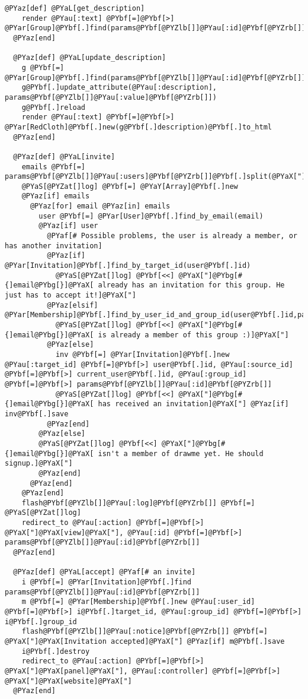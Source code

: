 \begin{Verbatim}[commandchars=@\[\]]
  @PYaz[def] @PYaL[get_description]
    render @PYau[:text] @PYbf[=]@PYbf[>] @PYar[Group]@PYbf[.]find(params@PYbf[@PYZlb[]]@PYau[:id]@PYbf[@PYZrb[]])@PYbf[.]description(@PYau[:source])
  @PYaz[end]
  
  @PYaz[def] @PYaL[update_description]
    g @PYbf[=] @PYar[Group]@PYbf[.]find(params@PYbf[@PYZlb[]]@PYau[:id]@PYbf[@PYZrb[]])
    g@PYbf[.]update_attribute(@PYau[:description], params@PYbf[@PYZlb[]]@PYau[:value]@PYbf[@PYZrb[]])
    g@PYbf[.]reload
    render @PYau[:text] @PYbf[=]@PYbf[>] @PYar[RedCloth]@PYbf[.]new(g@PYbf[.]description)@PYbf[.]to_html
  @PYaz[end]
  
  @PYaz[def] @PYaL[invite]
    emails @PYbf[=] params@PYbf[@PYZlb[]]@PYau[:users]@PYbf[@PYZrb[]]@PYbf[.]split(@PYaX["]@PYap[\n]@PYaX["])
    @PYaS[@PYZat[]log] @PYbf[=] @PYaY[Array]@PYbf[.]new
    @PYaz[if] emails
      @PYaz[for] email @PYaz[in] emails
        user @PYbf[=] @PYar[User]@PYbf[.]find_by_email(email)
        @PYaz[if] user
          @PYaf[# Possible problems, the user is already a member, or has another invitation]
          @PYaz[if] @PYar[Invitation]@PYbf[.]find_by_target_id(user@PYbf[.]id)
            @PYaS[@PYZat[]log] @PYbf[<<] @PYaX["]@PYbg[#{]email@PYbg[}]@PYaX[ already has an invitation for this group. He just has to accept it!]@PYaX["]
          @PYaz[elsif] @PYar[Membership]@PYbf[.]find_by_user_id_and_group_id(user@PYbf[.]id,params@PYbf[@PYZlb[]]@PYau[:id]@PYbf[@PYZrb[]])
            @PYaS[@PYZat[]log] @PYbf[<<] @PYaX["]@PYbg[#{]email@PYbg[}]@PYaX[ is already a member of this group :)]@PYaX["]
          @PYaz[else]
            inv @PYbf[=] @PYar[Invitation]@PYbf[.]new @PYau[:target_id] @PYbf[=]@PYbf[>] user@PYbf[.]id, @PYau[:source_id] @PYbf[=]@PYbf[>] current_user@PYbf[.]id, @PYau[:group_id] @PYbf[=]@PYbf[>] params@PYbf[@PYZlb[]]@PYau[:id]@PYbf[@PYZrb[]]
            @PYaS[@PYZat[]log] @PYbf[<<] @PYaX["]@PYbg[#{]email@PYbg[}]@PYaX[ has received an invitation]@PYaX["] @PYaz[if] inv@PYbf[.]save
          @PYaz[end]
        @PYaz[else]
        @PYaS[@PYZat[]log] @PYbf[<<] @PYaX["]@PYbg[#{]email@PYbg[}]@PYaX[ isn't a member of drawme yet. He should signup.]@PYaX["]
        @PYaz[end]
      @PYaz[end]
    @PYaz[end]
    flash@PYbf[@PYZlb[]]@PYau[:log]@PYbf[@PYZrb[]] @PYbf[=] @PYaS[@PYZat[]log]
    redirect_to @PYau[:action] @PYbf[=]@PYbf[>] @PYaX["]@PYaX[view]@PYaX["], @PYau[:id] @PYbf[=]@PYbf[>] params@PYbf[@PYZlb[]]@PYau[:id]@PYbf[@PYZrb[]]
  @PYaz[end]
  
  @PYaz[def] @PYaL[accept] @PYaf[# an invite]
    i @PYbf[=] @PYar[Invitation]@PYbf[.]find params@PYbf[@PYZlb[]]@PYau[:id]@PYbf[@PYZrb[]]
    m @PYbf[=] @PYar[Membership]@PYbf[.]new @PYau[:user_id] @PYbf[=]@PYbf[>] i@PYbf[.]target_id, @PYau[:group_id] @PYbf[=]@PYbf[>] i@PYbf[.]group_id
    flash@PYbf[@PYZlb[]]@PYau[:notice]@PYbf[@PYZrb[]] @PYbf[=] @PYaX["]@PYaX[Invitation accepted]@PYaX["] @PYaz[if] m@PYbf[.]save
    i@PYbf[.]destroy
    redirect_to @PYau[:action] @PYbf[=]@PYbf[>] @PYaX["]@PYaX[panel]@PYaX["], @PYau[:controller] @PYbf[=]@PYbf[>] @PYaX["]@PYaX[website]@PYaX["]
  @PYaz[end]
  

\end{Verbatim}
